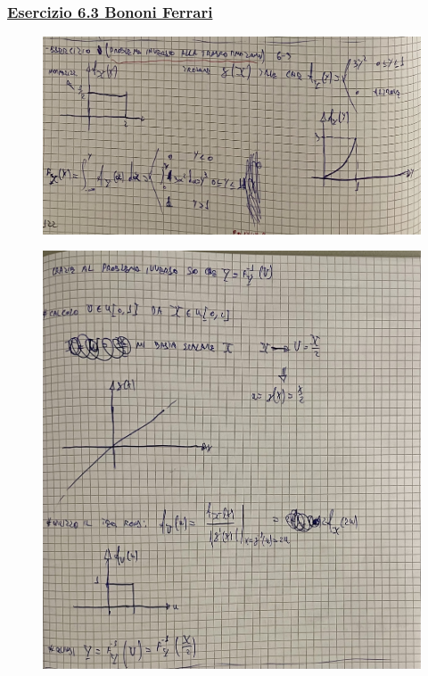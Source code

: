 \documentclass{article}
\begin{document}
\subsubsection{\underline{Esercizio 6.3 Bononi Ferrari}}
\begin{figure}[H]
\centering
\includegraphics[scale=0.10]{ese/30.jpeg}
\end{figure}
\begin{figure}[H]
\centering
\includegraphics[scale=0.10]{ese/30a.jpeg}
\end{figure}
\end{document}
